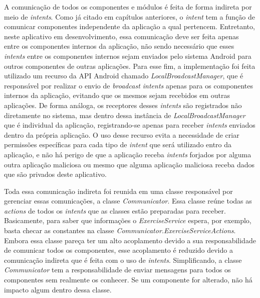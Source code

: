 A comunicação de todos os componentes e módulos é feita de forma indireta por meio de \textit{intents}. Como já citado em capítulos anteriores, o \textit{intent} tem a função de comunicar componentes independente da aplicação a qual pertencem. Entretanto, neste aplicativo em desenvolvimento, essa comunicação deve ser feita apenas entre os componentes internos da aplicação, não sendo necessário que esses \textit{intents} entre os componentes internos sejam enviados pelo sistema Android para outros componentes de outras aplicações. Para esse fim, a implementação foi feita utilizado um recurso da API Android chamado \textit{LocalBroadcastManager}, que é responsável por realizar o envio de \textit{broadcast intents} apenas para os componentes internos da aplicação, evitando que os mesmos sejam recebidos em outras aplicações. De forma análoga, os receptores desses \textit{intents} são registrados não diretamente no sistema, mas dentro dessa instância de \textit{LocalBroadcastManager} que é individual da aplicação, registrando-se apenas para receber \textit{intents} enviados dentro da própria aplicação. O uso desse recurso evita a necessidade de criar permissões específicas para cada tipo de \textit{intent} que será utilizado entro da aplicação, e não há perigo de que a aplicação receba \textit{intents} forjados por alguma outra aplicação maliciosa ou mesmo que alguma aplicação maliciosa receba dados que são privados deste aplicativo.

Toda essa comunicação indireta foi reunida em uma classe responsável por gerenciar essas comunicações, a classe \textit{Communicator}. Essa classe reúne todas as \textit{actions} de todos os \textit{intents} que as classes estão preparadas para receber. Basicamente, para saber que informações o \textit{ExerciseService} espera, por exemplo, basta checar as constantes na classe \textit{Communicator.ExerciseServiceActions}. Embora essa classe pareça ter um alto acoplamento devido a sua responsabilidade de comunicar todos os componentes, esse acoplamento é reduzido devido a comunicação indireta que é feita com o uso de \textit{intents}. Simplificando, a classe \textit{Communicator} tem a responsabilidade de enviar mensagens para todos os componentes sem realmente os conhecer. Se um componente for alterado, não há impacto algum dentro dessa classe.

